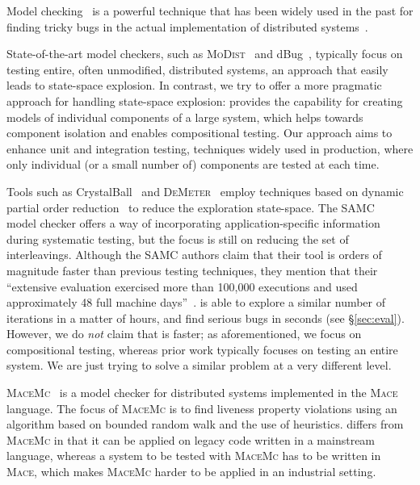 Model checking~\cite{godefroid1997verisoft} is a powerful technique that has been widely used in the past for finding tricky bugs in the actual implementation of distributed systems~\cite{killian2007life, yang2009modist, yabandeh2009crystalball, guerraoui2011model, guo2011practical, simsa2011dbug, leesatapornwongsa2014samc}. 

State-of-the-art model checkers, such as \textsc{MoDist}~\cite{yang2009modist} and dBug~\cite{simsa2011dbug}, typically focus on testing entire, often unmodified, distributed systems, an approach that easily leads to state-space explosion. In contrast, we try to offer a more pragmatic approach for handling state-space explosion: \psharp provides the capability for creating models of individual components of a large system, which helps towards component isolation and enables compositional testing. Our approach aims to enhance unit and integration testing, techniques widely used in production, where only individual (or a small number of) components are tested at each time.

Tools such as CrystalBall~\cite{yabandeh2009crystalball} and \textsc{DeMeter}~\cite{guo2011practical} employ techniques based on dynamic partial order reduction~\cite{lauterburg2010evaluating} to reduce the exploration state-space. The SAMC~\cite{leesatapornwongsa2014samc} model checker offers a way of incorporating application-specific information during systematic testing, but the focus is still on reducing the set of interleavings. Although the SAMC authors claim that their tool is orders of magnitude faster than previous testing techniques, they mention that their ``extensive evaluation exercised more than 100,000 executions and used approximately 48 full machine days''~\cite{leesatapornwongsa2014samc}. \psharp is able to explore a similar number of iterations in a matter of hours, and find serious bugs in seconds (see \S\ref{sec:eval}). However, we do \emph{not} claim that \psharp is faster; as aforementioned, we focus on compositional testing, whereas prior work typically focuses on testing an entire system. We are just trying to solve a similar problem at a very different level.

\textsc{MaceMc}~\cite{killian2007life} is a model checker for distributed systems implemented in the \textsc{Mace} language. The focus of \textsc{MaceMc} is to find liveness property violations using an algorithm based on bounded random walk and the use of heuristics. \psharp differs from \textsc{MaceMc} in that it can be applied on legacy code written in a mainstream language, whereas a system to be tested with \textsc{MaceMc} has to be written in \textsc{Mace}, which makes \textsc{MaceMc} harder to be applied in an industrial setting.

